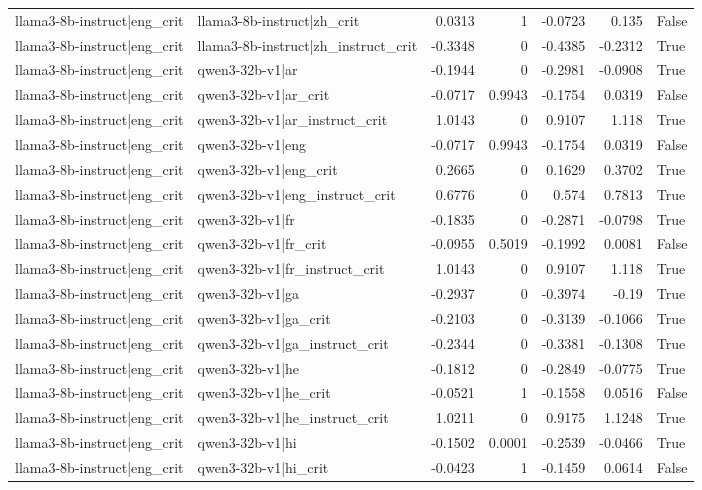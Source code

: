 \begin{table}
\begin{tabular}{l l r r r r l}
llama3-8b-instruct|eng_crit & llama3-8b-instruct|zh_crit & 0.0313 & 1 & -0.0723 & 0.135 & False \\
llama3-8b-instruct|eng_crit & llama3-8b-instruct|zh_instruct_crit & -0.3348 & 0 & -0.4385 & -0.2312 & True \\
llama3-8b-instruct|eng_crit & qwen3-32b-v1|ar & -0.1944 & 0 & -0.2981 & -0.0908 & True \\
llama3-8b-instruct|eng_crit & qwen3-32b-v1|ar_crit & -0.0717 & 0.9943 & -0.1754 & 0.0319 & False \\
llama3-8b-instruct|eng_crit & qwen3-32b-v1|ar_instruct_crit & 1.0143 & 0 & 0.9107 & 1.118 & True \\
llama3-8b-instruct|eng_crit & qwen3-32b-v1|eng & -0.0717 & 0.9943 & -0.1754 & 0.0319 & False \\
llama3-8b-instruct|eng_crit & qwen3-32b-v1|eng_crit & 0.2665 & 0 & 0.1629 & 0.3702 & True \\
llama3-8b-instruct|eng_crit & qwen3-32b-v1|eng_instruct_crit & 0.6776 & 0 & 0.574 & 0.7813 & True \\
llama3-8b-instruct|eng_crit & qwen3-32b-v1|fr & -0.1835 & 0 & -0.2871 & -0.0798 & True \\
llama3-8b-instruct|eng_crit & qwen3-32b-v1|fr_crit & -0.0955 & 0.5019 & -0.1992 & 0.0081 & False \\
llama3-8b-instruct|eng_crit & qwen3-32b-v1|fr_instruct_crit & 1.0143 & 0 & 0.9107 & 1.118 & True \\
llama3-8b-instruct|eng_crit & qwen3-32b-v1|ga & -0.2937 & 0 & -0.3974 & -0.19 & True \\
llama3-8b-instruct|eng_crit & qwen3-32b-v1|ga_crit & -0.2103 & 0 & -0.3139 & -0.1066 & True \\
llama3-8b-instruct|eng_crit & qwen3-32b-v1|ga_instruct_crit & -0.2344 & 0 & -0.3381 & -0.1308 & True \\
llama3-8b-instruct|eng_crit & qwen3-32b-v1|he & -0.1812 & 0 & -0.2849 & -0.0775 & True \\
llama3-8b-instruct|eng_crit & qwen3-32b-v1|he_crit & -0.0521 & 1 & -0.1558 & 0.0516 & False \\
llama3-8b-instruct|eng_crit & qwen3-32b-v1|he_instruct_crit & 1.0211 & 0 & 0.9175 & 1.1248 & True \\
llama3-8b-instruct|eng_crit & qwen3-32b-v1|hi & -0.1502 & 0.0001 & -0.2539 & -0.0466 & True \\
llama3-8b-instruct|eng_crit & qwen3-32b-v1|hi_crit & -0.0423 & 1 & -0.1459 & 0.0614 & False \\

\end{tabular}
\end{table}
